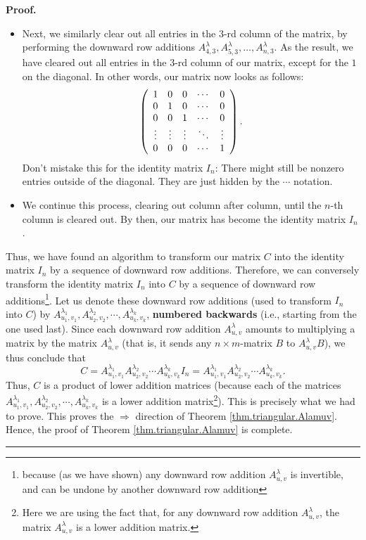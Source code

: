\documentclass[numbers=enddot,12pt,final,onecolumn,notitlepage]{scrartcl}%
\theoremstyle{definition}
\newenvironment{proof}[1][Proof]{\noindent\textbf{#1.} }{\ \rule{0.5em}{0.5em}}
\begin{document}
\begin{proof}
\begin{itemize}
\item Next, we similarly clear out all entries in the $3$-rd column of the
matrix, by performing the downward row additions $A^{\lambda}_{4,3},
A^{\lambda}_{5,3}, \ldots, A^{\lambda}_{n,3}$. As the result, we have cleared
out all entries in the $3$-rd column of our matrix, except for the $1$ on the
diagonal. In other words, our matrix now looks as follows:
\[
\left(
\begin{array}
[c]{ccccc}%
1 & 0 & 0 & \cdots & 0\\
0 & 1 & 0 & \cdots & 0\\
0 & 0 & 1 & \cdots & 0\\
\vdots & \vdots & \vdots & \ddots & \vdots\\
0 & 0 & 0 & \cdots & 1
\end{array}
\right)  .
\]
Don't mistake this for the identity matrix $I_{n}$: There might still be
nonzero entries outside of the diagonal. They are just hidden by the $\cdots$ notation.

\item We continue this process, clearing out column after column, until the
$n$-th column is cleared out. By then, our matrix has become the identity
matrix $I_{n}$.
\end{itemize}

Thus, we have found an algorithm to transform our matrix $C$ into the identity
matrix $I_{n}$ by a sequence of downward row additions. Therefore, we can
conversely transform the identity matrix $I_{n}$ into $C$ by a sequence of
downward row additions\footnote{because (as we have shown) any downward row
addition $A_{u,v}^{\lambda}$ is invertible, and can be undone by another
downward row addition}. Let us denote these downward row additions (used to
transform $I_{n}$ into $C$) by $A_{u_{1},v_{1}}^{\lambda_{1}},A_{u_{2},v_{2}%
}^{\lambda_{2}},\cdots,A_{u_{k},v_{k}}^{\lambda_{k}}$, \textbf{numbered
backwards} (i.e., starting from the one used last). Since each downward row
addition $A_{u,v}^{\lambda}$ amounts to multiplying a matrix by the matrix
$A_{u,v}^{\lambda}$ (that is, it sends any $n\times m$-matrix $B$ to
$A_{u,v}^{\lambda}B$), we thus conclude that
\[
C=A_{u_{1},v_{1}}^{\lambda_{1}}A_{u_{2},v_{2}}^{\lambda_{2}}\cdots
A_{u_{k},v_{k}}^{\lambda_{k}}I_{n}=A_{u_{1},v_{1}}^{\lambda_{1}}A_{u_{2}%
,v_{2}}^{\lambda_{2}}\cdots A_{u_{k},v_{k}}^{\lambda_{k}}.
\]
Thus, $C$ is a product of lower addition matrices (because each of the
matrices $A_{u_{1},v_{1}}^{\lambda_{1}},A_{u_{2},v_{2}}^{\lambda_{2}}%
,\cdots,A_{u_{k},v_{k}}^{\lambda_{k}}$ is a lower addition
matrix\footnote{Here we are using the fact that, for any downward row addition
$A_{u,v}^{\lambda}$, the matrix $A_{u,v}^{\lambda}$ is a lower addition
matrix.}). This is precisely what we had to prove. This proves the
$\Longrightarrow$ direction of Theorem \ref{thm.triangular.Alamuv}. Hence, the
proof of Theorem \ref{thm.triangular.Alamuv} is complete.
\end{proof}
\end{document}
